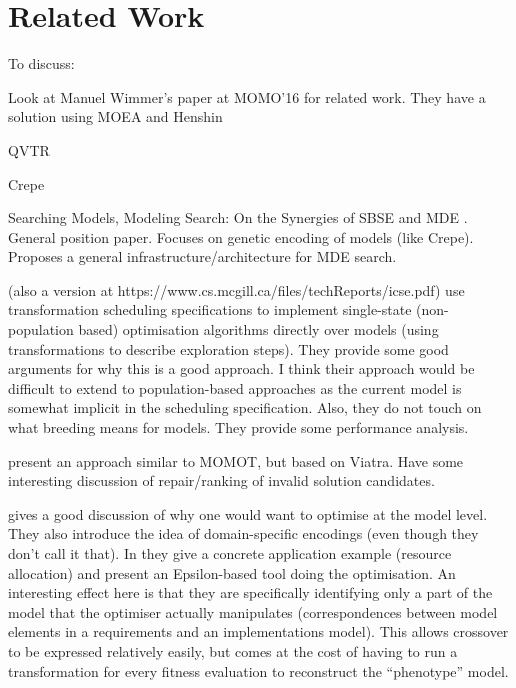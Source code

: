 \section{Related Work}
\label{section:related_work}

	\begin{draftlist}
		To discuss:
		\item Look at Manuel Wimmer's paper at MOMO'16 for related work. They have a solution using MOEA and Henshin
		\item QVTR \cite{Drago+10,Drago+11,Drago+15}
		\item Crepe
		\item Searching Models, Modeling Search: On the Synergies of SBSE and MDE \cite{Kessentini+13}. General position paper. Focuses on genetic encoding of models 
		      (like Crepe). Proposes a general infrastructure/architecture for MDE search.
		\item \cite{Denil+14} (also a version at https://www.cs.mcgill.ca/files/techReports/icse.pdf) use transformation scheduling specifications to implement 
		      single-state (non-population based) optimisation algorithms directly over models 
		      (using transformations to describe exploration steps). They provide some good arguments for why this is a good approach. I think their approach would be
					difficult to extend to population-based approaches as the current model is somewhat implicit in the scheduling specification. Also, they do not touch on
					what breeding means for models. They provide some performance analysis.
					
					
		\item \cite{Abdeen+14} present an approach similar to MOMOT, but based on Viatra. Have some interesting discussion of repair/ranking of invalid solution
		      candidates.
					
	  \item \cite{BurtonPoulding13} gives a good discussion of why one would want to optimise at the model level. They also introduce the idea of domain-specific
		      encodings (even though they don't call it that). In \cite{Burton+12} they give a concrete application example (resource allocation) and present an 
					Epsilon-based tool doing the optimisation. An interesting effect here is that they are specifically identifying only a part of the model that the optimiser
					actually manipulates (correspondences between model elements in a requirements and an implementations model). This allows crossover to be expressed
					relatively easily, but comes at the cost of having to run a transformation for every fitness evaluation to reconstruct the ``phenotype'' model.
	\end{draftlist}
